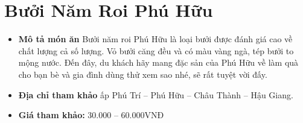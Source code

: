 \documentclass{article}
\begin{document}
\section{Bưởi Năm Roi Phú Hữu}
\begin{itemize}
    \item{\textbf{Mô tả món ăn}} Bưởi năm roi Phú Hữu là loại bưởi được đánh giá cao về chất lượng cả số lượng. Vỏ bưởi căng đều và có màu vàng ngà, tép bưởi to mộng nước. Đến đây, du khách hãy mang đặc sản của Phú Hữu về làm quà cho bạn bè và gia đình dùng thử xem sao nhé, sẽ rất tuyệt vời đấy.
    \item{\textbf{Địa chỉ tham khảo}} ấp Phú Trí – Phú Hữu – Châu Thành – Hậu Giang.
    \item{\textbf{Giá tham khảo:}} 30.000 – 60.000VNĐ
\end{itemize}
\end{document}

